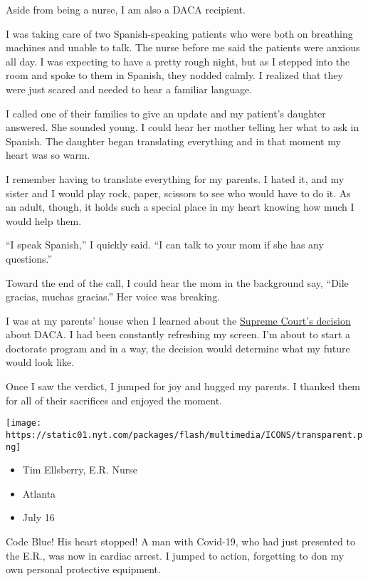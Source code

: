 Aside from being a nurse, I am also a DACA recipient.

I was taking care of two Spanish-speaking patients who were both on
breathing machines and unable to talk. The nurse before me said the
patients were anxious all day. I was expecting to have a pretty rough
night, but as I stepped into the room and spoke to them in Spanish, they
nodded calmly. I realized that they were just scared and needed to hear
a familiar language.

I called one of their families to give an update and my patient's
daughter answered. She sounded young. I could hear her mother telling
her what to ask in Spanish. The daughter began translating everything
and in that moment my heart was so warm.

I remember having to translate everything for my parents. I hated it,
and my sister and I would play rock, paper, scissors to see who would
have to do it. As an adult, though, it holds such a special place in my
heart knowing how much I would help them.

``I speak Spanish,'' I quickly said. ``I can talk to your mom if she has
any questions.''

Toward the end of the call, I could hear the mom in the background say,
``Dile gracias, muchas gracias.'' Her voice was breaking.

I was at my parents' house when I learned about the
\href{https://www.nytimes.com/2020/06/18/us/trump-daca-supreme-court.html}{Supreme
Court's decision} about DACA. I had been constantly refreshing my
screen. I'm about to start a doctorate program and in a way, the
decision would determine what my future would look like.

Once I saw the verdict, I jumped for joy and hugged my parents. I
thanked them for all of their sacrifices and enjoyed the moment.

\texttt{[image: https://static01.nyt.com/packages/flash/multimedia/ICONS/transparent.png]}

\begin{itemize}
\tightlist
\item
  Tim Ellsberry, E.R. Nurse
\item
  Atlanta
\item
  July 16
\end{itemize}

Code Blue! His heart stopped! A man with Covid-19, who had just
presented to the E.R., was now in cardiac arrest. I jumped to action,
forgetting to don my own personal protective equipment.

